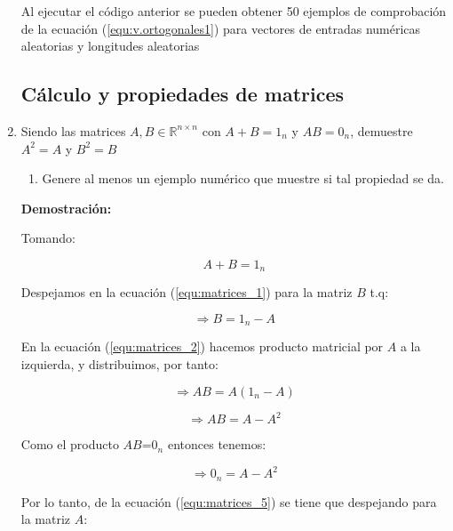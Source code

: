 \documentclass{article}
\begin{document}
\begin{enumerate}
Al ejecutar el código anterior se pueden obtener 50 ejemplos de comprobación de la ecuación (\ref{equ:v.ortogonales1}) para vectores de entradas numéricas aleatorias y longitudes aleatorias
 

\subsection{Cálculo y propiedades de matrices}
\item Siendo las matrices $A,B \in \mathbb{R}^{n\times n}$ con $A+B=1_n$ y $AB=0_n$, demuestre $A^2=A$ y $B^2=B$

\begin{enumerate}
    \item Genere al menos un ejemplo numérico que muestre si tal propiedad se da.
\end{enumerate}

\vspace{0.2cm}

\textbf{Demostración:}

Tomando:

\begin{equation}
\label{equ:matrices_1}
A+B=1_n
\end{equation}

Despejamos en la ecuación (\ref{equ:matrices_1}) para la matriz $B$ t.q:

\begin{equation}
\label{equ:matrices_2}
\Rightarrow B=1_n-A
\end{equation}

En la ecuación (\ref{equ:matrices_2}) hacemos producto matricial por $A$ a la izquierda, y distribuimos, por tanto: 

\begin{equation}
\label{equ:matrices_3}
\Rightarrow AB = A(1_n-A)
\end{equation}

\begin{equation}
\label{equ:matrices_4}
\Rightarrow AB = A-A^{2} 
\end{equation}

Como el producto $AB$=$0_n$ entonces tenemos: 

\begin{equation}
\label{equ:matrices_5}
\Rightarrow 0_n = A-A^{2} 
\end{equation}

Por lo tanto, de la ecuación (\ref{equ:matrices_5}) se tiene que despejando para la matriz $A$: 


\end{enumerate}
\end{document}
